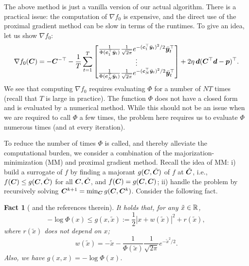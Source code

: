 \documentclass[10pt,twocolumn,twoside]{IEEEtran}
\newtheorem{Fact}{Fact}
\begin{document}
The above method is just a vanilla version of our actual algorithm.
There is a practical issue: the computation of $\nabla f_0$ is expensive, and the direct use of the proximal gradient method can be slow in terms of the runtimes.
To give an idea, let us show $\nabla f_0$:
\[
\nabla f_0({\bm C}) = - {\bm C}^{-\top} - \frac{1}{T} \sum_{t=1}^T
\begin{bmatrix}
\frac{1}{\Phi({\bm c}_1^\top \bar{{\bm y}}_t)} \frac{1}{\sqrt{2\pi}} e^{- ({\bm c}_1^\top \bar{{\bm y}}_t)^2/2} \bar{{\bm y}}_t^\top \\
\vdots \\
\frac{1}{\Phi({\bm c}_N^\top \bar{{\bm y}}_t)} \frac{1}{\sqrt{2\pi}} e^{- ({\bm c}_N^\top \bar{{\bm y}}_t)^2/2} \bar{{\bm y}}_t^\top
\end{bmatrix}
+ 2 \eta \, {\bm d} ({\bm C}^\top {\bm d} - {\bm p} )^\top.
\]
We see that computing $\nabla f_0$ requires evaluating $\Phi$ for a number of $NT$ times (recall that $T$ is large in practice).
The function  $\Phi$ does not have a closed form and is evaluated by a numerical method.
While this should not be an issue when we are required to call $\Phi$ a few times, the problem here requires us to evaluate $\Phi$ numerous times (and at every iteration).

To reduce the number of times $\Phi$ is called, and thereby alleviate the computational burden,
we consider a combination of the majorization-minimization (MM) and proximal gradient method.
Recall the idea of MM: i) build a surrogate of $f$ by finding a majorant  $g({\bm C},\tilde{{\bm C}})$ of $f$ at $\tilde{{\bm C}}$, i.e.,
$f({\bm C}) \leq g({\bm C},\tilde{{\bm C}})$ for all ${\bm C},\tilde{{\bm C}}$, and $f({\bm C}) = g({\bm C},{\bm C})$;
ii) handle the problem by recursively solving ${\bm C}^{k+1} = \min_{{\bm C}} g({\bm C},{\bm C}^k)$.
Consider the following fact.

\begin{Fact}[\cite{shao2021divide} and the references therein] \label{fact:mm}
	It holds that, for any $\tilde{x} \in \mathbb{R}$,
	\[
	-\log \Phi(x) \leq g(x, \tilde{x}) := \frac{1}{2} | x + w(\tilde{x}) |^2 + r(\tilde{x}),
	\]
	where $r(\tilde{x})$ does not depend on $x$;
	\[
	w(\tilde{x}) = - \tilde{x} - \frac{1}{\Phi(\tilde{x})} \frac{1}{\sqrt{2\pi}} e^{- \tilde{x}^2 / 2 }.
	\]
	Also, we have $g(x,x) = -\log \Phi(x)$.
\end{Fact}
\end{document}
